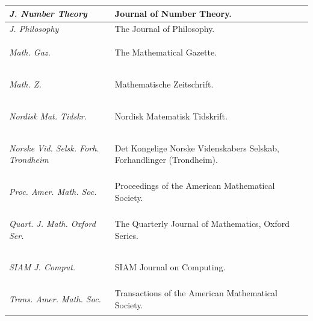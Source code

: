 \documentclass[11pt,reqno]{amsart}
\theoremstyle{blueplain}
\numberwithin{equation}{section}
\def\hyperlink#1#2{#2}}
\begin{document}
\begin{longtable}[c]{|>{\centering\arraybackslash}m{}|>{\centering\arraybackslash}m{}|}
\hypertarget{abbr:journal-J-Number-Theory}{}\hyperlink{abbr-source:CullyHugill2023}{\emph{J. Number Theory}} & Journal of Number Theory.\\\hline
\hypertarget{abbr:journal-J-Philosophy}{}\hyperlink{abbr-source:Tait1981}{\emph{J. Philosophy}} & The Journal of Philosophy.\\\hline
\hypertarget{abbr:journal-Math-Gaz}{}\hyperlink{abbr-source:Willans1964}{\emph{Math. Gaz.}} & The Mathematical Gazette.\\\hline
\hypertarget{abbr:journal-Math-Z}{}\hyperlink{abbr-source:ThornerZaman2024}{\emph{Math. Z.}} & Mathematische Zeitschrift.\\\hline
\hypertarget{abbr:journal-Nordisk-Mat-Tidskr}{}\hyperlink{abbr-source:Bang1952}{\emph{Nordisk Mat. Tidskr.}} & Nordisk Matematisk Tidskrift.\\\hline
\hypertarget{abbr:journal-Norske-Vid-Selsk-Forh-Trondheim}{}\hyperlink{abbr-source:Srinivasan1962}{\emph{Norske Vid. Selsk. Forh. Trondheim}} & Det Kongelige Norske Videnskabers Selskab, Forhandlinger (Trondheim).\\\hline
\hypertarget{abbr:journal-Proc-Amer-Math-Soc}{}\hyperlink{abbr-source:Ore1952}{\emph{Proc. Amer. Math. Soc.}} & Proceedings of the American Mathematical Society.\\\hline
\hypertarget{abbr:journal-Quart-J-Math-Oxford-Ser}{}\hyperlink{abbr-source:Ingham1937}{\emph{Quart. J. Math. Oxford Ser.}} & The Quarterly Journal of Mathematics, Oxford Series.\\\hline
\hypertarget{abbr:journal-SIAM-J-Comput}{}\hyperlink{abbr-source:Pratt1975}{\emph{SIAM J. Comput.}} & \hyperlink{abbr:SIAM}{SIAM} Journal on Computing.\\\hline
\hypertarget{abbr:journal-Trans-Amer-Math-Soc}{}\hyperlink{abbr-source:AvigadGerhardyTowsner2010}{\emph{Trans. Amer. Math. Soc.}} & Transactions of the American Mathematical Society.\\\hline
\end{longtable}
\endgroup
\end{document}
